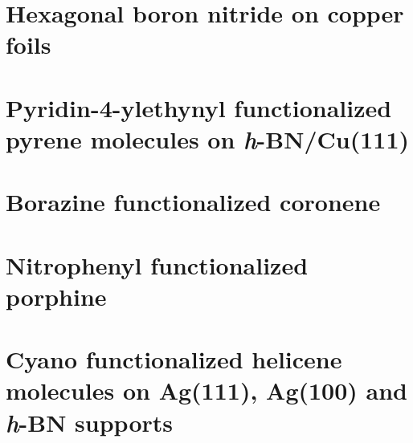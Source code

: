 \documentclass[
twoside,				%
BCOR=12mm,				%
headings=normal,		%
headsepline,			%
footsepline,			%
plainfootsepline,		%
]
{scrbook}
\begin{document}
\chapter{Hexagonal boron nitride on copper foils}
%


\chapter{Pyridin-4-ylethynyl functionalized pyrene molecules on \textit{h}-BN/Cu(111)}


\chapter{Borazine functionalized coronene}


\chapter{Nitrophenyl functionalized porphine}
    

\chapter{Cyano functionalized helicene molecules on Ag(111), Ag(100) and \textit{h}-BN supports}


\end{document}
